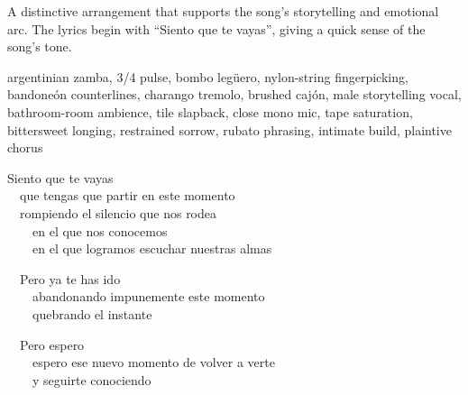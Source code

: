

\begin{notes}
A distinctive arrangement that supports the song's storytelling and emotional arc. %
The lyrics begin with “Siento que te vayas”, giving a quick sense of the song’s tone.
\end{notes}

\begin{style}
argentinian zamba, 3/4 pulse, bombo legüero, nylon-string fingerpicking, bandoneón counterlines, charango tremolo, brushed cajón, male storytelling vocal, bathroom-room ambience, tile slapback, close mono mic, tape saturation, bittersweet longing, restrained sorrow, rubato phrasing, intimate build, plaintive chorus
\end{style}

\begin{lyrics}
Siento que te vayas\\
  que tengas que partir en este momento\\
  rompiendo el silencio que nos rodea\\
    en el que nos conocemos\\
    en el que logramos escuchar nuestras almas

  Pero ya te has ido\\
    abandonando impunemente este momento\\
    quebrando el instante

  Pero espero\\
    espero ese nuevo momento de volver a verte\\
    y seguirte conociendo

\end{lyrics}

